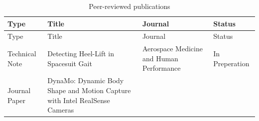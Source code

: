 \documentclass[defaultstyle,11pt]{comps}
\begin{document}
\hypertarget{tbl:pubs}{}
\begin{longtable}[]{@{}llll@{}}
\caption{\label{tbl:pubs}Peer-reviewed publications}\tabularnewline
\toprule
\begin{minipage}[b]{0.22\columnwidth}\raggedright
Type\strut
\end{minipage} & \begin{minipage}[b]{0.22\columnwidth}\raggedright
Title\strut
\end{minipage} & \begin{minipage}[b]{0.22\columnwidth}\raggedright
Journal\strut
\end{minipage} & \begin{minipage}[b]{0.22\columnwidth}\raggedright
Status\strut
\end{minipage}\tabularnewline
\midrule
\endfirsthead
\toprule
\begin{minipage}[b]{0.22\columnwidth}\raggedright
Type\strut
\end{minipage} & \begin{minipage}[b]{0.22\columnwidth}\raggedright
Title\strut
\end{minipage} & \begin{minipage}[b]{0.22\columnwidth}\raggedright
Journal\strut
\end{minipage} & \begin{minipage}[b]{0.22\columnwidth}\raggedright
Status\strut
\end{minipage}\tabularnewline
\midrule
\endhead
\begin{minipage}[t]{0.22\columnwidth}\raggedright
Technical Note\strut
\end{minipage} & \begin{minipage}[t]{0.22\columnwidth}\raggedright
Detecting Heel-Lift in Spacesuit Gait\strut
\end{minipage} & \begin{minipage}[t]{0.22\columnwidth}\raggedright
Aerospace Medicine and Human Performance\strut
\end{minipage} & \begin{minipage}[t]{0.22\columnwidth}\raggedright
In Preperation\strut
\end{minipage}\tabularnewline
\begin{minipage}[t]{0.22\columnwidth}\raggedright
Journal Paper\strut
\end{minipage} & \begin{minipage}[t]{0.22\columnwidth}\raggedright
DynaMo: Dynamic Body Shape and Motion Capture with Intel RealSense Cameras\strut
\end{minipage} & \begin{minipage}[t]{0.22\columnwidth}\raggedright

\end{minipage}
\end{longtable}
\end{document}
